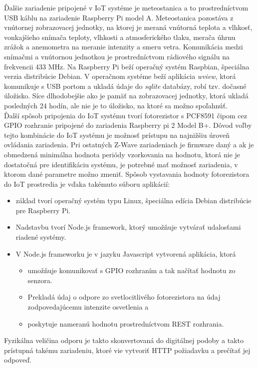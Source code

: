 \indent Ďalšie zariadenie pripojené v IoT systéme je meteostanica a to prostredníctvom USB káblu na zariadenie Raspberry Pi model A. Meteostanica pozostáva z vnútornej zobrazovacej jednotky, na ktorej je meraná vnútorná teplota a vlhkosť, vonkajšieho snímača teploty, vlhkosti a atmosferického tlaku,  merača úhrnu zrážok a anemometra na meranie intenzity a smeru vetra. Komunikácia medzi snímačmi a vnútornou jednotkou je prostredníctvom rádiového signálu na frekvencii 433 MHz. Na Raspberry Pi beží operačný systém Raspbian, špeciálna verzia distribúcie Debian. V operačnom systéme beží aplikácia \textit{wview}, ktorá komunikuje s USB portom a ukladá údaje do \textit{sqlite} databázy, robí tzv. dočasné úložisko. Síce dlhodobejšie ako je pamäť na zobrazovacej jednotky, ktorá ukladá posledných 24 hodín, ale nie je to úložisko, na ktoré sa možno spoľahnúť. \\ 
\indent Ďalší spôsob pripojenia do IoT systému tvorí fotorezistor s PCF8591 čipom cez GPIO rozhranie pripojené do zariadenia Raspberry pi 2 Model B+. Dôvod voľby tejto kombinácie do IoT systému je možnosť prístupu na najnižšiu úroveň ovládania zariadenia. Pri ostatných Z-Wave zariadeniach je firmware daný a ak je obmedzená minimálna hodnota periódy vzorkovania na hodnotu, ktorá nie je dostatočná pre identifikáciu systému, je potrebné mať možnosť zariadenia, v ktorom dané parametre možno zmeniť. Spôsob vystavania hodnoty fotorezistora do IoT prostredia je vďaka takémuto súboru aplikácií:
\begin{itemize}
\item základ tvorí operačný systém typu Linux, špeciálna edícia Debian distribúcie pre Raspberry Pi.
\item Nadstavbu tvorí Node.js framework, ktorý umožňuje vytvárať udalosťami riadené  systémy.
\item V Node.js frameworku je v jazyku Javascript vytvorená aplikácia, ktorá 
  \begin{itemize}
  \item umožňuje komunikovať s GPIO rozhraním a tak načítať hodnotu zo senzora.
  \item Prekladá údaj o odpore zo svetlocitlivého fotorezistora na údaj zodpovedajúcemu intenzite osvetlenia a
  \item poskytuje nameranú hodnotu prostredníctvom REST rozhrania.
  \end{itemize}
\end{itemize} 
Fyzikálna veličina odporu je takto skonvertovaná do digitálnej podoby a takto prístupná takému zariadeniu, ktoré vie vytvoriť HTTP požiadavku a prečítať jej odpoveď.
 
